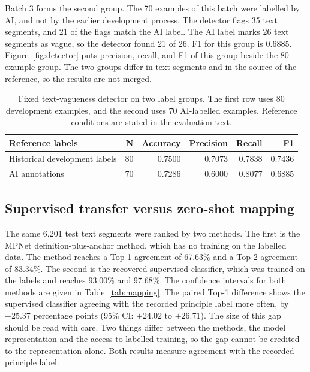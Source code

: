 Batch 3 forms the second group. The 70 examples of this batch were labelled by AI, and not by the earlier development process. The detector flags 35 text segments, and 21 of the flags match the AI label. The AI label marks 26 text segments as vague, so the detector found 21 of 26. F1 for this group is 0.6885. Figure~\ref{fig:detector} puts precision, recall, and F1 of this group beside the 80-example group. The two groups differ in text segments and in the source of the reference, so the results are not merged.

\begin{table}[tbp]
\centering\small
\caption{Fixed text-vagueness detector on two label groups. The first row uses 80 development examples, and the second uses 70 AI-labelled examples. Reference conditions are stated in the evaluation text.}
\label{tab:detector}
\begin{tabularx}{\linewidth}{@{}Yrrrrr@{}}
\toprule\textbf{Reference labels} & \textbf{N} & \textbf{Accuracy} & \textbf{Precision} & \textbf{Recall} & \textbf{F1}\\\midrule
Historical development labels & 80 & 0.7500 & 0.7073 & 0.7838 & 0.7436\\
AI annotations & 70 & 0.7286 & 0.6000 & 0.8077 & 0.6885\\\bottomrule
\end{tabularx}
\end{table}



\subsection{Supervised transfer versus zero-shot mapping}
\label{sec:eval_mapping}

The same 6,201 test text segments were ranked by two methods. The first is the MPNet definition-plus-anchor method, which has no training on the labelled data. The method reaches a Top-1 agreement of 67.63\% and a Top-2 agreement of 83.34\%. The second is the recovered supervised classifier, which was trained on the labels and reaches 93.00\% and 97.68\%. The confidence intervals for both methods are given in Table~\ref{tab:mapping}. The paired Top-1 difference shows the supervised classifier agreeing with the recorded principle label more often, by $+25.37$ percentage points (95\% CI: $+24.02$ to $+26.71$). The size of this gap should be read with care. Two things differ between the methods, the model representation and the access to labelled training, so the gap cannot be credited to the representation alone. Both results measure agreement with the recorded principle label.

